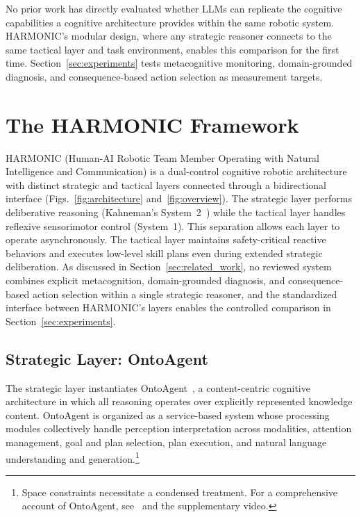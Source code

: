 \documentclass[letterpaper, 10 pt, conference]{ieeeconf}  %
\begin{document}
No prior work has directly evaluated whether LLMs can 
replicate the cognitive capabilities a cognitive architecture provides within the same robotic system. HARMONIC's modular design, where any strategic reasoner connects to the same tactical layer and task environment, enables this comparison for the first time. Section~\ref{sec:experiments} tests metacognitive monitoring, domain-grounded diagnosis, and 
consequence-based action selection as measurement targets.

\section{The HARMONIC Framework}
\label{sec:harmonic}
HARMONIC (Human-AI Robotic Team Member Operating with Natural Intelligence and Communication) is a dual-control cognitive robotic architecture with distinct strategic and tactical layers connected through a bidirectional interface (Figs.~\ref{fig:architecture} and~\ref{fig:overview}). The strategic layer performs deliberative reasoning (Kahneman's System~2~\cite{kahneman2011thinking}) while the tactical layer handles reflexive sensorimotor control (System~1). This separation allows each layer to operate asynchronously. The tactical layer maintains safety-critical reactive behaviors and executes low-level skill plans even during extended strategic deliberation. As discussed in Section~\ref{sec:related_work}, no reviewed system combines explicit metacognition, domain-grounded diagnosis, and consequence-based action selection within a single strategic reasoner, and the standardized interface between HARMONIC's layers enables the controlled comparison in Section~\ref{sec:experiments}.

\subsection{Strategic Layer: OntoAgent}

The strategic layer instantiates OntoAgent~\cite{english2020ontoagent-87e,mcshane2021linguistics-995,mcshane2024agents-172}, a content-centric cognitive architecture in which all reasoning operates over explicitly represented knowledge content. OntoAgent is organized as a service-based system whose processing modules collectively handle perception interpretation across modalities, attention management, goal and plan selection, plan execution, and natural language understanding and generation.\footnote{Space constraints necessitate a condensed treatment. For a comprehensive account of OntoAgent, see~\cite{mcshane2024agents-172,mcshane2021linguistics-995} and the supplementary video.}
\end{document}
